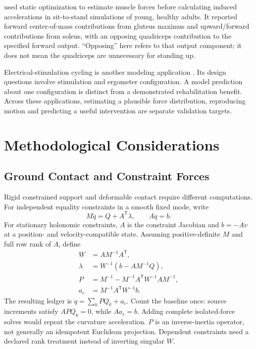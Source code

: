 \cite{Caruthers2016} used static optimization to estimate muscle forces before calculating induced accelerations in sit-to-stand simulations of young, healthy adults. It reported forward center-of-mass contributions from gluteus maximus and upward/forward contributions from soleus, with an opposing quadriceps contribution to the specified forward output. ``Opposing'' here refers to that output component; it does not mean the quadriceps are unnecessary for standing up.

Electrical-stimulation cycling is another modeling application \cite{Schutte1993}. Its design questions involve stimulation and ergometer configuration. A model prediction about one configuration is distinct from a demonstrated rehabilitation benefit. Across these applications, estimating a plausible force distribution, reproducing motion and predicting a useful intervention are separate validation targets.

\section{Methodological Considerations}
\label{sec:iaa_methods}

\subsection{Ground Contact and Constraint Forces}

Rigid constrained support and deformable contact require different computations. For independent equality constraints in a smooth fixed mode, write
\[
M\ddot q=Q+A^{\mathsf T}\lambda,\qquad A\ddot q=b.
\]
For stationary holonomic constraints, $A$ is the constraint Jacobian and $b=-\dot A v$ at a position- and velocity-compatible state. Assuming positive-definite $M$ and full row rank of $A$, define
\[
\begin{aligned}
W&=AM^{-1}A^{\mathsf T},\\
\lambda&=W^{-1}(b-AM^{-1}Q),\\
P&=M^{-1}-M^{-1}A^{\mathsf T}W^{-1}AM^{-1},\\
a_c&=M^{-1}A^{\mathsf T}W^{-1}b.
\end{aligned}
\]
The resulting ledger is $\ddot q=\sum_k PQ_k+a_c$. Count the baseline once: source increments satisfy $APQ_k=0$, while $Aa_c=b$. Adding complete isolated-force solves would repeat the curvature acceleration. $P$ is an inverse-inertia operator, not generally an idempotent Euclidean projection. Dependent constraints need a declared rank treatment instead of inverting singular $W$.

